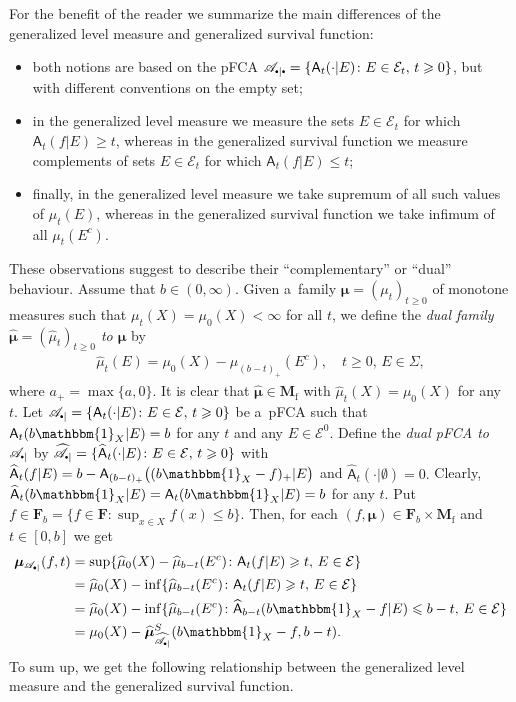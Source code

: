 \documentclass[preprint,11pt]{elsarticle}
\theoremstyle{definition}
\newcommand\bF{\mathbf{F}} %
\newcommand\bFb{\mathbf{F}_{b}} %
\newcommand\bMf{\mathbf{M}_{\mathrm{f}}}%
\newcommand\cE{{\mathcal E}}
\newcommand\sA{\mathsf{A}}
\newcommand\aAd[3][E]{\sA_{#3}(#2|#1)}%
\newcommand\sbullet[1][.5]{\mathbin{\vcenter{\hbox{\scalebox{#1}{$\bullet$}}}}}
\newcommand\bpA{\mathscr {A}_{\sbullet|}}%
\newcommand\bpeA{\mathscr {A}_{\sbullet|\sbullet}}%
\newcommand{\bmu}{\boldsymbol{\mu}}
\newcommand\bmub[1][\bpeA]{\bmu_{#1}}
\renewcommand\ge{\geqslant}
\renewcommand\le{\leqslant}
\newcommand{\mI}[1]{\mathbbm{1}_{#1}}%
\begin{document}
For the benefit of the reader we summarize the main differences of the generalized level measure and generalized survival function:
\begin{itemize}[noitemsep]
    \item both notions are based on the pFCA  $\bpeA=\{\sA_t(\cdot|E)\colon E\in \cE_t,\, t\ge 0\}$, but with different conventions on the empty set;

    \item in the generalized level measure we measure the sets $E\in\cE_t$ for which $\sA_t(f|E)\ge t$, whereas in the generalized survival function we measure complements of sets $E\in\cE_t$ for which $\sA_t(f|E)\le t$;

    \item finally, in the generalized level measure we take supremum of all such values of $\mu_t(E)$, whereas in the generalized survival function we take infimum of all $\mu_t(E^c)$.
\end{itemize}
These observations suggest to describe their ``complementary'' or ``dual'' behaviour.
Assume that
$b\in (0,\infty).$
Given a~family $\bmu=(\mu_t)_{t\ge 0}$  of monotone measures such that $\mu_t(X)=\mu_0(X)<\infty$ for all $t$,
we define the \textit{dual family $\widehat{\bmu}=(\widehat{\mu}_t)_{t\ge 0}$
to $\bmu$}  by
\begin{align}\label{MK1}
\widehat{\mu}_t(E)=\mu_0(X)-\mu_{(b-t)_+}(E^c),\quad t\ge 0,\,E\in\Sigma,
\end{align}
where $a_+=\max\{a,0\}.$
It is clear that $\widehat{\bmu}\in\bMf$ with $\widehat{\mu}_t(X)=\mu_0(X)$ for any $t.$ Let $\bpA=\{\sA_t(\cdot|E)\colon E\in \cE,\, t\ge 0\}$ be a~pFCA such that $\sA_t(b\mI{X}|E)=b$ for any $t$ and any $E\in \cE^0.$ Define the \textit{dual pFCA to} $\bpA$ by
$\widehat{\bpA}=\{\widehat{\sA}_t(\cdot|E)\colon E\in \cE,\,t\ge 0\}$ with
$\widehat{\sA}_t(f|E)= b-\sA_{(b-t)_+}\big((b\mI{X}-f)_+|E\big)$
and $\widehat{\sA}_t(\cdot|\emptyset)=0.$
Clearly,  $\widehat{\sA}_t(b\mI{X}|E)=\sA_t(b\mI{X}|E)=b$  for any $t.$
Put  $f\in \bFb=\{f\in\bF\colon \textstyle{\sup_{x\in X} f(x)}\le b\}.$
Then, for each $(f,\bmu)\in \bFb\times \bMf$ and $t\in [0,b]$ we get
\begin{align*}
\bmub[\bpA](f,t)&=\sup\{\widehat{\mu}_0(X)-\widehat{\mu}_{b-t}(E^c)\colon \aAd{f}{t}\ge t,\,E\in \cE\}
\\&=\widehat{\mu}_0(X)-\inf\{\widehat{\mu}_{b-t}(E^c)\colon \aAd{f}{t}\ge t,\,E\in \cE\}
\\&=\widehat{\mu}_0(X)-\inf\{\widehat{\mu}_{b-t}(E^c)\colon \widehat{\sA}_{b-t}(b\mI{X}-f|E)\le b- t,\,E\in \cE\}
\\&=\mu_0(X)-\widehat{\bmu}^{S}_{\widehat{\bpA}}(b\mI{X}-f,b-t).
\end{align*}
To sum up, we get the following relationship between the generalized level measure and the generalized survival function.
\end{document}
